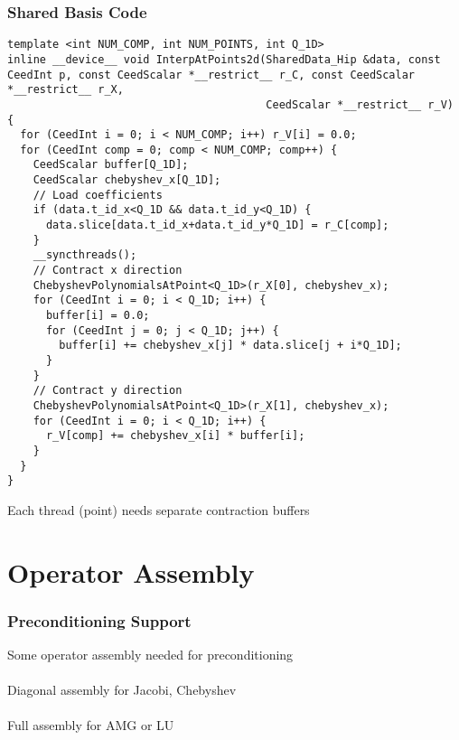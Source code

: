 \documentclass{beamer}
\begin{document}
\begin{frame}[fragile]
\begin{center}
\frametitle{Shared Basis Code}

{\tiny
\begin{lstlisting}[style=boxedC]
template <int NUM_COMP, int NUM_POINTS, int Q_1D>
inline __device__ void InterpAtPoints2d(SharedData_Hip &data, const CeedInt p, const CeedScalar *__restrict__ r_C, const CeedScalar *__restrict__ r_X,
                                        CeedScalar *__restrict__ r_V) {
  for (CeedInt i = 0; i < NUM_COMP; i++) r_V[i] = 0.0;
  for (CeedInt comp = 0; comp < NUM_COMP; comp++) {
    CeedScalar buffer[Q_1D];
    CeedScalar chebyshev_x[Q_1D];
    // Load coefficients
    if (data.t_id_x<Q_1D && data.t_id_y<Q_1D) {
      data.slice[data.t_id_x+data.t_id_y*Q_1D] = r_C[comp];
    }
    __syncthreads();
    // Contract x direction
    ChebyshevPolynomialsAtPoint<Q_1D>(r_X[0], chebyshev_x);
    for (CeedInt i = 0; i < Q_1D; i++) {
      buffer[i] = 0.0;
      for (CeedInt j = 0; j < Q_1D; j++) {
        buffer[i] += chebyshev_x[j] * data.slice[j + i*Q_1D];
      }
    }
    // Contract y direction
    ChebyshevPolynomialsAtPoint<Q_1D>(r_X[1], chebyshev_x);
    for (CeedInt i = 0; i < Q_1D; i++) {
      r_V[comp] += chebyshev_x[i] * buffer[i];
    }
  }
}
\end{lstlisting}
}

Each thread (point) needs separate contraction buffers\\

\end{center}
\end{frame}

\section{Operator Assembly}

\begin{frame}
\begin{center}
\frametitle{Preconditioning Support}

Some operator assembly needed for preconditioning\\

~\\

Diagonal assembly for Jacobi, Chebyshev\\

~\\

Full assembly for AMG or LU\\

\end{center}
\end{frame}
\end{document}
